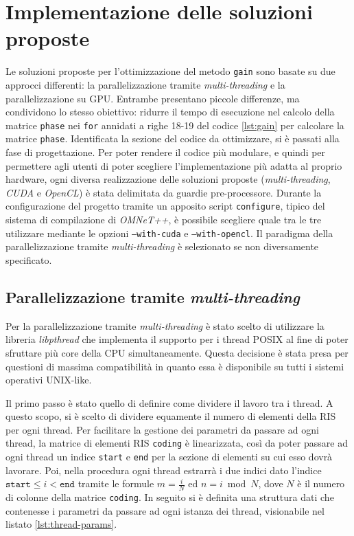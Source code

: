 \section{Implementazione delle soluzioni proposte}
\label{sec:implementazione}

Le soluzioni proposte per l'ottimizzazione del metodo \texttt{gain} sono basate su
due approcci differenti: la parallelizzazione tramite \textit{multi-threading} e
la parallelizzazione su GPU. Entrambe presentano piccole differenze, ma condividono
lo stesso obiettivo: ridurre il tempo di esecuzione nel calcolo della matrice
\texttt{phase} nei \texttt{for} annidati a righe 18-19 del codice \ref{lst:gain}
per calcolare la matrice \texttt{phase}. Identificata la sezione del codice da
ottimizzare, si è passati alla fase di progettazione. Per poter rendere il
codice più modulare, e quindi per permettere agli utenti di poter scegliere l'implementazione
più adatta al proprio hardware, ogni diversa realizzazione delle soluzioni
proposte (\textit{multi-threading}, \textit{CUDA} e \textit{OpenCL}) è stata
delimitata da guardie pre-processore. Durante la configurazione del progetto tramite
un apposito script \texttt{configure}, tipico del sistema di compilazione di \textit{OMNeT++},
è possibile scegliere quale tra le tre utilizzare mediante le opzioni \texttt{--with-cuda}
e \texttt{--with-opencl}. Il paradigma della parallelizzazione tramite \textit{multi-threading}
è selezionato se non diversamente specificato.

\subsection{Parallelizzazione tramite \textit{multi-threading}}
\label{subsec:multithreading}

Per la parallelizzazione tramite \textit{multi-threading} è stato scelto di utilizzare
la libreria \textit{libpthread} che implementa il supporto per i thread POSIX al
fine di poter sfruttare più core della CPU simultaneamente. Questa decisione è stata
presa per questioni di massima compatibilità in quanto essa è disponibile su tutti
i sistemi operativi UNIX-like.

Il primo passo è stato quello di definire come dividere il lavoro tra i thread.
A questo scopo, si è scelto di dividere equamente il numero di elementi della RIS
per ogni thread. Per facilitare la gestione dei parametri da passare ad ogni
thread, la matrice di elementi RIS \texttt{coding} è linearizzata, così da poter
passare ad ogni thread un indice \texttt{start} e \texttt{end} per la sezione di
elementi su cui esso dovrà lavorare. Poi, nella procedura ogni thread estrarrà i
due indici dato l'indice $\texttt{start}\le i < \texttt{end}$ tramite le formule
$m = \frac{i}{N}$ ed $n = i \bmod N$, dove $N$ è il numero di colonne della
matrice \texttt{coding}. In seguito si è definita una struttura dati che
contenesse i parametri da passare ad ogni istanza dei thread, visionabile nel listato
\ref{lst:thread-params}.

